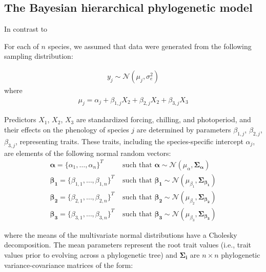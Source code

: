 \documentclass{article}\usepackage[]{graphicx}\usepackage[]{color}
\begin{document}
\subsection*{The Bayesian hierarchical phylogenetic model}

In contrast to 


For each of $n$ species, we assumed that data were generated from the following sampling distribution:

\begin{align}
  \label{modely}
  y_j \sim \mathcal{N}(\mu_j, \sigma_e^2)
\end{align}
where
\begin{align}
  \label{modelmu}
  \mu_j = \alpha_j + \beta_{1,j} X_2 + \beta_{2,j} X_2 + \beta_{3,j} X_3
\end{align}

Predictors $X_1$, $X_2$, $X_3$ are standardized forcing, chilling, and photoperiod, and their effects on the phenology of species $j$ are determined by parameters $\beta_{1,j}$, $\beta_{2,j}$, $\beta_{3,j}$, representing traits. These traits, including the species-specific intercept $\alpha_j$, are elements of the following normal random vectors:
\begin{align}
  \boldsymbol{\alpha} = \{\alpha_1, \ldots, \alpha_n\}^T & \text{ such that }
  \boldsymbol{\alpha} \sim \mathcal{N}(\mu_{\alpha},\boldsymbol{\Sigma_{\alpha}}) \\
  \boldsymbol{\beta_1} =  \{\beta_{1,1}, \ldots, \beta_{1,n}\}^T & \text{ such that }
  \boldsymbol{\beta_1} \sim \mathcal{N}(\mu_{\beta_1},\boldsymbol{\Sigma_{\beta_1}}) \nonumber \\
  \boldsymbol{\beta_2} =  \{\beta_{2,1}, \ldots, \beta_{2,n}\}^T & \text{ such that }
  \boldsymbol{\beta_2} \sim \mathcal{N}(\mu_{\beta_2},\boldsymbol{\Sigma_{\beta_2}}) \nonumber \\
  \boldsymbol{\beta_3} =  \{\beta_{3,1}, \ldots, \beta_{3,n}\}^T & \text{ such that }
  \boldsymbol{\beta_3} \sim \mathcal{N}(\mu_{\beta_3},\boldsymbol{\Sigma_{\beta_3}}) \nonumber
\end{align}

\noindent where the means of the multivariate normal distributions have a Cholesky decomposition. The mean parameters represent the root trait values (i.e., trait values prior to evolving across a phylogenetic tree) and $\boldsymbol{\Sigma_i}$ are $n \times n$ phylogenetic variance-covariance matrices of the form: \\ %
\end{document}
